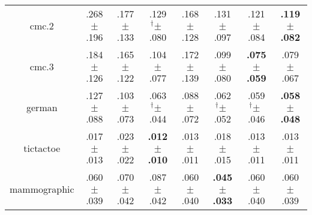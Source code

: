 \begin{tabular}{|c|ccccccc|}
cmc.2 & .268$^{\phantom{\dag}}\pm^{\phantom{\dag}}$.196\cellcolor{red!40} & .177$^{\phantom{\dag}}\pm^{\phantom{\dag}}$.133\cellcolor{green!8} & .129$^{\dag}\pm^{\phantom{\dag}}$.080\cellcolor{green!34} & .168$^{\phantom{\dag}}\pm^{\phantom{\dag}}$.128\cellcolor{green!13} & .131$^{\phantom{\dag}}\pm^{\phantom{\dag}}$.097\cellcolor{green!33} & .121$^{\phantom{\dag}}\pm^{\phantom{\dag}}$.084\cellcolor{green!38} & \textbf{.119$^{\phantom{\dag}}\pm^{\phantom{\dag}}$.082}\cellcolor{green!40} \\
cmc.3 & .184$^{\phantom{\dag}}\pm^{\phantom{\dag}}$.126\cellcolor{red!40} & .165$^{\phantom{\dag}}\pm^{\phantom{\dag}}$.122\cellcolor{red!25} & .104$^{\phantom{\dag}}\pm^{\phantom{\dag}}$.077\cellcolor{green!18} & .172$^{\phantom{\dag}}\pm^{\phantom{\dag}}$.139\cellcolor{red!31} & .099$^{\phantom{\dag}}\pm^{\phantom{\dag}}$.080\cellcolor{green!22} & \textbf{.075$^{\phantom{\dag}}\pm^{\phantom{\dag}}$.059}\cellcolor{green!40} & .079$^{\phantom{\dag}}\pm^{\phantom{\dag}}$.067\cellcolor{green!36} \\
german & .127$^{\phantom{\dag}}\pm^{\phantom{\dag}}$.088\cellcolor{red!40} & .103$^{\phantom{\dag}}\pm^{\phantom{\dag}}$.073\cellcolor{red!11} & .063$^{\dag}\pm^{\phantom{\dag}}$.044\cellcolor{green!34} & .088$^{\phantom{\dag}}\pm^{\phantom{\dag}}$.072\cellcolor{green!5} & .062$^{\dag}\pm^{\phantom{\dag}}$.052\cellcolor{green!35} & .059$^{\dag}\pm^{\phantom{\dag}}$.046\cellcolor{green!38} & \textbf{.058$^{\phantom{\dag}}\pm^{\phantom{\dag}}$.048}\cellcolor{green!40} \\
tictactoe & .017$^{\phantom{\dag}}\pm^{\phantom{\dag}}$.013\cellcolor{green!5} & .023$^{\phantom{\dag}}\pm^{\phantom{\dag}}$.022\cellcolor{red!40} & \textbf{.012$^{\phantom{\dag}}\pm^{\phantom{\dag}}$.010}\cellcolor{green!40} & .013$^{\phantom{\dag}}\pm^{\phantom{\dag}}$.011\cellcolor{green!30} & .018$^{\phantom{\dag}}\pm^{\phantom{\dag}}$.015\cellcolor{red!2} & .013$^{\phantom{\dag}}\pm^{\phantom{\dag}}$.011\cellcolor{green!31} & .013$^{\phantom{\dag}}\pm^{\phantom{\dag}}$.011\cellcolor{green!32} \\
mammographic & .060$^{\phantom{\dag}}\pm^{\phantom{\dag}}$.039\cellcolor{green!10} & .070$^{\phantom{\dag}}\pm^{\phantom{\dag}}$.042\cellcolor{red!8} & .087$^{\phantom{\dag}}\pm^{\phantom{\dag}}$.042\cellcolor{red!40} & .060$^{\phantom{\dag}}\pm^{\phantom{\dag}}$.040\cellcolor{green!10} & \textbf{.045$^{\phantom{\dag}}\pm^{\phantom{\dag}}$.033}\cellcolor{green!40} & .060$^{\phantom{\dag}}\pm^{\phantom{\dag}}$.040\cellcolor{green!10} & .060$^{\phantom{\dag}}\pm^{\phantom{\dag}}$.039\cellcolor{green!11} \\

\end{tabular}
